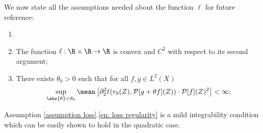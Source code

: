 We now state all the assumptions needed about the function $ \ell $ for future reference:
\begin{assumption}
    \label{assumption loss}
    \begin{enumerate}
        \item[]
        \item The function $ \ell : \R \times \R \to \R $ is convex and $ C^2 $ with respect to its second argument;
        \item There exists $ \theta_{ 0 } > 0 $ such that for all $ f, g \in L^2 ( X ) $
            \begin{equation}
                \label{eq: loss regularity}
                \sup_{ \abs{ \theta } < \theta_{ 0 } }
                \mean \left[
                    \partial_{ 2 }^2 \ell ( r_{ 0 } ( Z ), \meanop [ g + \theta f ] ( Z ) ) \cdot \meanop [ f ] ( Z )^2
                \right] < \infty
            ;\end{equation}
            \label{en: loss regularity}
    \end{enumerate}
\end{assumption}
Assumption \ref{assumption loss}.\ref{en: loss regularity} is a mild integrability condition which can be easily shown to hold in the quadratic case.
